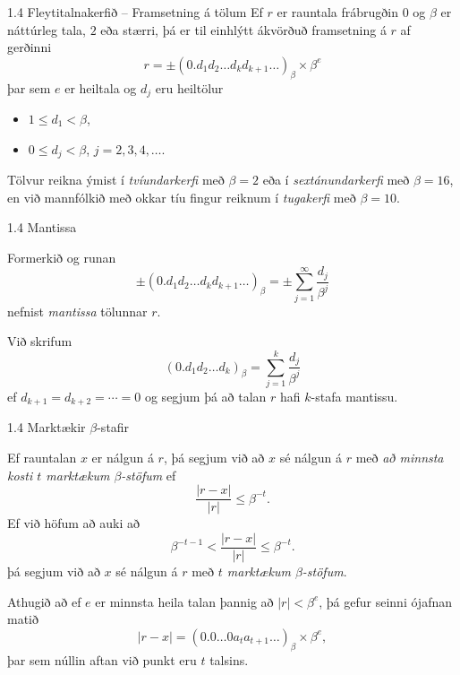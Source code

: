 \begin{frame}{1.4 Fleytitalnakerfið -- Framsetning á tölum} 
Ef $r$ er rauntala frábrugðin $0$ og $\beta$ er náttúrleg tala, $2$ eða stærri, þá er til einhlýtt ákvörðuð framsetning á $r$ af gerðinni 
\begin{equation*}
    r = 
    \pm (0.d_1d_2\dots d_kd_{k+1}\dots)_\beta\times \beta^e
\end{equation*}
þar sem $e$ er heiltala og $d_j$ eru heiltölur
\begin{itemize}
 \item  $1\leq d_1<\beta$, 
 \item $0\leq d_j<\beta$, $j=2,3,4,\dots$.
\end{itemize}
\pause

\smallskip

 Tölvur reikna ýmist í {\it tvíundarkerfi} með $\beta=2$ 
eða í {\it sextánundarkerfi} með $\beta=16$, en við mannfólkið með okkar 
tíu fingur reiknum í {\it tugakerfi} með $\beta=10$.
\end{frame}
%
%
\begin{frame}{1.4 Mantissa}

Formerkið og runan
\begin{equation*}
    \pm(0.d_1d_2\dots d_kd_{k+1}\dots)_\beta =
    \pm\sum_{j=1}^\infty \dfrac{d_j}{\beta^j}
\end{equation*}
nefnist {\it mantissa} tölunnar $r$. \pause

\smallskip

Við skrifum
\begin{equation*}
    (0.d_1d_2\dots d_k)_\beta = 
    \sum_{j=1}^k \dfrac{d_j}{\beta^j}
\end{equation*}
ef $d_{k+1} = d_{k+2} = \cdots = 0$ og segjum þá að talan $r$ hafi
$k$-stafa mantissu. 
\end{frame}
%
%
\begin{frame}{1.4 Marktækir $\beta$-stafir} 

Ef rauntalan $x$ er nálgun á $r$, þá segjum við að $x$ sé nálgun á 
$r$ með {\it að minnsta kosti $t$ marktækum $\beta$-stöfum} ef
\begin{equation*}
    \dfrac{|r-x|}{|r|}\leq \beta^{-t}.
\end{equation*}
\pause
Ef við höfum að auki að
\begin{equation*}
\beta^{-t-1}<\dfrac{|r-x|}{|r|}\leq \beta^{-t}.
\end{equation*}
þá segjum við að $x$ sé nálgun á $r$ með  {\it $t$ marktækum
$\beta$-stöfum}.

\pause
 Athugið að ef $e$ er minnsta heila talan þannig að $|r|<\beta^e$, 
þá gefur seinni ójafnan matið 
\begin{equation*}
    |r-x| = (0.0\dots 0a_ta_{t+1}\dots)_\beta \times \beta^e,
\end{equation*}
þar sem núllin aftan við punkt eru $t$ talsins.  

\end{frame}

